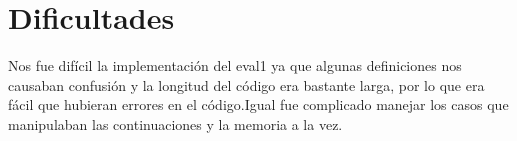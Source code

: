 \documentclass{article}
\begin{document}
    \section*{Dificultades}
    Nos fue difícil la implementación del eval1 ya que algunas definiciones nos causaban confusión y la longitud del código era bastante larga, por lo que era fácil que hubieran errores en el código.Igual fue complicado manejar los casos que manipulaban las continuaciones y la memoria a la vez.
    
\end{document}
